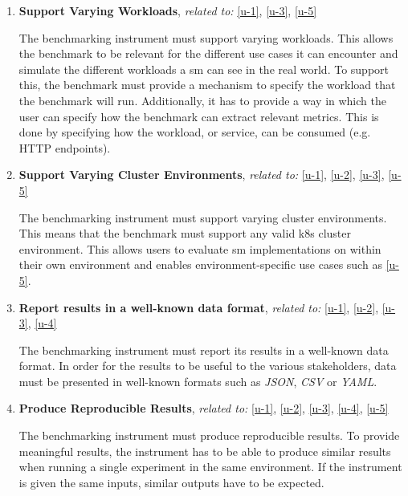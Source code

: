 \begin{enumerate}[label=\textbf{FR\arabic*}, leftmargin=3\parindent]
    \item \textbf{Support Varying Workloads}, \textit{related to:} \ref{u-1}, \ref{u-3}, \ref{u-5} 
    \label{system:fr-4}
    
    The benchmarking instrument must support varying workloads. This allows the benchmark to be relevant for the different use cases it can encounter and simulate the different workloads a \gls{sm} can see in the real world. To support this, the benchmark must provide a mechanism to specify the workload that the benchmark will run. Additionally, it has to provide a way in which the user can specify how the benchmark can extract relevant metrics. This is done by specifying how the workload, or service, can be consumed (e.g. HTTP endpoints).
    
    \item \textbf{Support Varying Cluster Environments}, \textit{related to:} \ref{u-1}, \ref{u-2}, \ref{u-3}, \ref{u-5} 
    \label{system:fr-5}
    
    The benchmarking instrument must support varying cluster environments. This means that the benchmark must support any valid \gls{k8s} cluster environment. This allows users to evaluate \gls{sm} implementations on within their own environment and enables environment-specific use cases such as \ref{u-5}.
    
    \item \textbf{Report results in a well-known data format}, \textit{related to:} \ref{u-1}, \ref{u-2}, \ref{u-3}, \ref{u-4}
    \label{system:fr-6}
    
    The benchmarking instrument must report its results in a well-known data format. In order for the results to be useful to the various stakeholders, data must be presented in well-known formats such as \textit{JSON}, \textit{CSV} or \textit{YAML}.
    
    
    \item \textbf{Produce Reproducible Results}, \textit{related to:} \ref{u-1}, \ref{u-2}, \ref{u-3}, \ref{u-4}, \ref{u-5} 
    \label{system:fr-7}
    
    The benchmarking instrument must produce reproducible results. To provide meaningful results, the instrument has to be able to produce similar results when running a single experiment in the same environment. If the instrument is given the same inputs, similar outputs have to be expected.
    
\end{enumerate}

